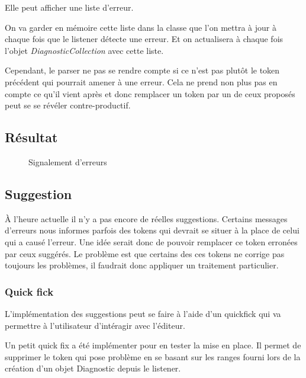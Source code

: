 \documentclass[
    iict, %
    il, %
]{heig-tb}
\begin{document}
Elle peut afficher une liste d'erreur.

On va garder en mémoire cette liste dans la classe que l'on mettra à jour à chaque fois que le listener détecte une erreur.
Et on actualisera à chaque fois l'objet \emph{DiagnosticCollection} avec cette liste.

Cependant, le parser ne pas se rendre compte si ce n'est pas plutôt le token précédent qui pourrait amener à une erreur.
Cela ne prend non plus pas en compte ce qu'il vient après et donc remplacer un token par un de ceux proposés peut se se révéler contre-productif.

\subsection{Résultat}

\begin{figure}[!h]
    \begin{center}
    \end{center}
    \caption[Signalement d'erreurs]{\label{lint} Signalement d'erreurs}
\end{figure}

\subsection{Suggestion}
À l'heure actuelle  il n'y a pas encore de réelles suggestions.
Certains messages d'erreurs nous informes parfois des tokens qui devrait se situer à la place de celui qui a causé l'erreur.
Une idée serait donc de pouvoir remplacer ce token erronées par ceux suggérés.
Le problème est que certains des ces tokens ne corrige pas toujours les problèmes, il faudrait donc appliquer un traitement particulier.

\subsubsection{Quick fick}

L'implémentation des suggestions peut se faire à l'aide d'un quickfick qui va permettre à l'utilisateur d'intéragir avec l'éditeur.

Un petit quick fix a été implémenter pour en tester la mise en place. Il permet de supprimer le token qui pose problème en se basant sur les ranges fourni lors de la création d'un objet Diagnostic depuis le listener.
\end{document}
